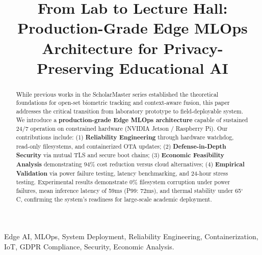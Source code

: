 \documentclass[conference]{IEEEtran}
\begin{document}
\title{From Lab to Lecture Hall: Production-Grade Edge MLOps Architecture for Privacy-Preserving Educational AI}

\author{
}

\maketitle

\begin{abstract}
While previous works in the ScholarMaster series established the theoretical foundations for open-set biometric tracking and context-aware fusion, this paper addresses the critical transition from laboratory prototype to field-deployable system. We introduce a \textbf{production-grade Edge MLOps architecture} capable of sustained 24/7 operation on constrained hardware (NVIDIA Jetson / Raspberry Pi). Our contributions include: (1) \textbf{Reliability Engineering} through hardware watchdog, read-only filesystems, and containerized OTA updates; (2) \textbf{Defense-in-Depth Security} via mutual TLS and secure boot chains; (3) \textbf{Economic Feasibility Analysis} demonstrating 94\% cost reduction versus cloud alternatives; (4) \textbf{Empirical Validation} via power failure testing, latency benchmarking, and 24-hour stress testing. Experimental results demonstrate 0\% filesystem corruption under power failures, mean inference latency of 59ms (P99: 72ms), and thermal stability under 65$^{\circ}$C, confirming the system's readiness for large-scale academic deployment.
\end{abstract}

\begin{IEEEkeywords}
Edge AI, MLOps, System Deployment, Reliability Engineering, Containerization, IoT, GDPR Compliance, Security, Economic Analysis.
\end{IEEEkeywords}

\end{document}
